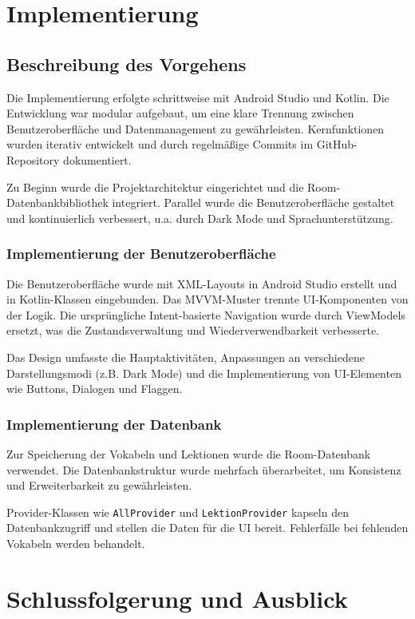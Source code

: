 \documentclass[12pt,a4paper]{article}
\begin{document}
\section{Implementierung}

\subsection{Beschreibung des Vorgehens}
Die Implementierung erfolgte schrittweise mit Android Studio und Kotlin. Die Entwicklung war modular aufgebaut, um eine klare Trennung zwischen Benutzeroberfläche und Datenmanagement zu gewährleisten. Kernfunktionen wurden iterativ entwickelt und durch regelmäßige Commits im GitHub-Repository dokumentiert.

Zu Beginn wurde die Projektarchitektur eingerichtet und die Room-Datenbankbibliothek integriert. Parallel wurde die Benutzeroberfläche gestaltet und kontinuierlich verbessert, u.a. durch Dark Mode und Sprachunterstützung.

\subsubsection{Implementierung der Benutzeroberfläche}
Die Benutzeroberfläche wurde mit XML-Layouts in Android Studio erstellt und in Kotlin-Klassen eingebunden. Das MVVM-Muster trennte UI-Komponenten von der Logik. Die ursprüngliche Intent-basierte Navigation wurde durch ViewModels ersetzt, was die Zustandsverwaltung und Wiederverwendbarkeit verbesserte.

Das Design umfasste die Hauptaktivitäten, Anpassungen an verschiedene Darstellungsmodi (z.B. Dark Mode) und die Implementierung von UI-Elementen wie Buttons, Dialogen und Flaggen.

\subsubsection{Implementierung der Datenbank}
Zur Speicherung der Vokabeln und Lektionen wurde die Room-Datenbank verwendet. Die Datenbankstruktur wurde mehrfach überarbeitet, um Konsistenz und Erweiterbarkeit zu gewährleisten.

Provider-Klassen wie \texttt{AllProvider} und \texttt{LektionProvider} kapseln den Datenbankzugriff und stellen die Daten für die UI bereit. Fehlerfälle bei fehlenden Vokabeln werden behandelt.

\section{Schlussfolgerung und Ausblick}
\end{document}
